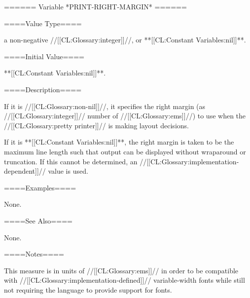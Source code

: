 ====== Variable *PRINT-RIGHT-MARGIN* ======

====Value Type====

a non-negative //[[CL:Glossary:integer]]//, or **[[CL:Constant Variables:nil]]**.

====Initial Value====

**[[CL:Constant Variables:nil]]**.

====Description====

If it is //[[CL:Glossary:non-nil]]//, it specifies the right margin (as //[[CL:Glossary:integer]]// number of //[[CL:Glossary:ems]]//) to use when the //[[CL:Glossary:pretty printer]]// is making layout decisions.

If it is **[[CL:Constant Variables:nil]]**, the right margin is taken to be the maximum line length such that output can be displayed without wraparound or truncation. If this cannot be determined, an //[[CL:Glossary:implementation-dependent]]// value is used.

====Examples====

None.

====See Also====

None.

====Notes====

This measure is in units of //[[CL:Glossary:ems]]// in order to be compatible with //[[CL:Glossary:implementation-defined]]// variable-width fonts while still not requiring the language to provide support for fonts.

